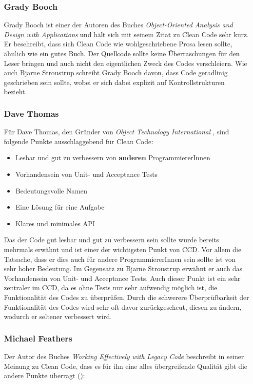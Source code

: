 \subsubsection{Grady Booch}
Grady Booch ist einer der Autoren des Buches \textit{Object-Oriented Analysis and Design with Applications} \cite{Booch2004} und hält sich mit seinem Zitat zu Clean Code sehr kurz. Er beschreibt, dass sich Clean Code wie wohlgeschriebene Prosa lesen sollte, ähnlich wie ein gutes Buch. Der Quellcode sollte keine Überraschungen für den Leser bringen und auch nicht den eigentlichen Zweck des Codes verschleiern. Wie auch Bjarne Stroustrup schreibt Grady Booch davon, dass Code geradlinig geschrieben sein sollte, wobei er sich dabei explizit auf Kontrollstrukturen bezieht.

\subsubsection{Dave Thomas}
Für Dave Thomas, den Gründer von \textit{Object Technology International} \cite{Thomas2016},  sind folgende Punkte ausschlaggebend für Clean Code:

\begin{itemize}
	\item Lesbar und gut zu verbessern von \textbf{anderen} ProgrammiererInnen
	\item Vorhandensein von Unit- und Acceptance Tests
	\item Bedeutungsvolle Namen
	\item Eine Lösung für eine Aufgabe
	\item Klares und minimales API
\end{itemize}

Das der Code gut lesbar und gut zu verbessern sein sollte wurde bereits mehrmals erwähnt und ist einer der wichtigsten Punkt von CCD. Vor allem die Tatsache, dass er dies auch für andere ProgrammiererInnen sein sollte ist von sehr hoher Bedeutung. Im Gegensatz zu Bjarne Stroustrup erwähnt er auch das Vorhandensein von Unit- und Acceptance Tests. Auch dieser Punkt ist ein sehr zentraler im CCD, da es ohne Tests nur sehr aufwendig möglich ist, die Funktionalität des Codes zu überprüfen. Durch die schwerere Überprüfbarkeit der Funktionalität des Codes wird sehr oft davor zurückgescheut, diesen zu ändern, wodurch er seltener verbessert wird.

\subsubsection{Michael Feathers}
Der Autor des Buches \textit{Working Effectively with Legacy Code} \cite{Feathers2013} beschreibt in seiner Meinung zu Clean Code, dass es für ihn eine alles übergreifende Qualität gibt die andere Punkte überragt (\cite[Seite 36]{Martin2008}): 

